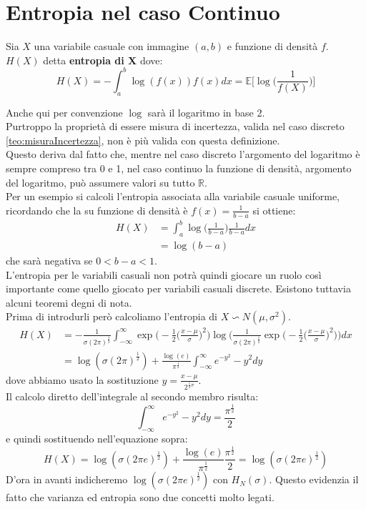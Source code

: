 \section{Entropia nel caso Continuo}
\label{sec:EntropiaContinuo}
\begin{defi}
Sia $X$ una variabile casuale con immagine $(a,b)$ e funzione di densità $f$. $H(X)$ detta \textbf{entropia di X} dove:
$$H(X)=-\int_a^b \log(f(x))f(x)dx= \mathbb{E}\bigg[ \log \bigg( \frac{1}{f(X)} \bigg) \bigg]$$
\end{defi}
Anche qui per convenzione $\log$ sarà il logaritmo in base 2.\\
Purtroppo la proprietà di essere misura di incertezza, valida nel caso discreto \ref{teo:misuraIncertezza}, non è più valida con questa definizione.\\
Questo deriva dal fatto che, mentre nel caso discreto l'argomento del logaritmo è sempre compreso tra 0 e 1, nel caso continuo la funzione di densità, argomento del logaritmo, può assumere valori su tutto $\mathbb{R}$.\\
Per un esempio si calcoli l'entropia associata alla variabile casuale uniforme, ricordando che la su  funzione di densità è $f(x)=\frac{1}{b-a}$ si ottiene:
\[
\begin{split}
H(X)& = \int_a^b \log \bigg( \frac{1}{b-a} \bigg) \frac{1}{b-a} dx \\
& =\log(b-a)
\end{split}
\]
che sarà negativa se $0 < b-a < 1$.\\
L'entropia per le variabili casuali non potrà quindi giocare un ruolo così importante come quello giocato per variabili casuali discrete. Esistono tuttavia alcuni teoremi degni di nota.\\
Prima di introdurli però calcoliamo l'entropia di $X \backsim N(\mu, \sigma^2)$.
\[
\begin{split}
H(X)& = - \frac{1}{\sigma (2\pi)^{\frac{1}{2}}} \int_{-\infty}^{\infty} \exp \bigg(- \frac{1}{2} \bigg( \frac{x-\mu}{\sigma} \bigg)^2 \bigg) \log \bigg( \frac{1}{\sigma (2\pi)^{\frac{1}{2}}} \exp \bigg( - \frac{1}{2} \bigg( \frac{x-\mu}{ \sigma} \bigg)^2 \bigg)  \bigg) dx \\
& = \log (\sigma (2 \pi)^{\frac{1}{2}})+ \frac{\log(e)}{\pi^{\frac{1}{2}}}\int_{-\infty}^{\infty} e^{-y^2}-y^2 dy
\end{split}
\]
dove abbiamo usato la sostituzione $y=\frac{x-\mu}{2^{\frac{1}{2}\sigma}}$.\\
Il calcolo diretto dell'integrale al secondo membro risulta:
$$\int_{-\infty}^{\infty} e^{-y^2}-y^2 dy= \frac{\pi^{\frac{1}{2}}}{2}$$
e quindi sostituendo nell'equazione sopra:
\begin{equation}
H(X)=\log (\sigma (2\pi e)^{\frac{1}{2}})+\frac{\log(e)}{\pi^{\frac{1}{2}}}\frac{\pi^{\frac{1}{2}}}{2}=\log(\sigma(2\pi e)^{\frac{1}{2}})
\end{equation}
D'ora in avanti indicheremo $\log(\sigma(2\pi e)^{\frac{1}{2}})$ con $H_N(\sigma)$. Questo evidenzia il fatto che varianza ed entropia sono due concetti molto legati.

